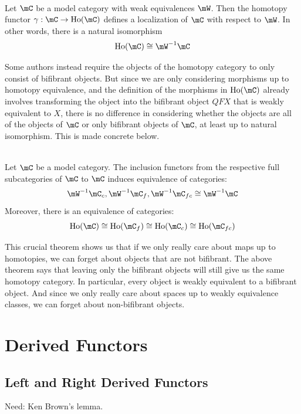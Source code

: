 \documentclass[a4paper]{article}
\begin{document}
\begin{prp}{}{}\\
Let $\mC$ be a model category with weak equivalences $\mW$. Then the homotopy functor $\gamma:\mC\to\text{Ho}(\mC)$ defines a localization of $\mC$ with respect to $\mW$. In other words, there is a natural isomorphism $$\text{Ho}(\mC)\cong\mW^{-1}\mC$$
\end{prp}

Some authors instead require the objects of the homotopy category to only consist of bifibrant objects. But since we are only considering morphisms up to homotopy equivalence, and the definition of the morphisms in $\text{Ho}(\mC)$ already involves transforming the object into the bifibrant object $QFX$ that is weakly equivalent to $X$, there is no difference in considering whether the objects are all of the objects of $\mC$ or only bifibrant objects of $\mC$, at least up to natural isomorphism. This is made concrete below. 

\begin{prp}{}{}\\
Let $\mC$ be a model category. The inclusion functors from the respective full subcategories of $\mC$ to $\mC$ induces equivalence of categories: $$\mW^{-1}\mC_c,\mW^{-1}\mC_f,\mW^{-1}\mC_{fc}\cong\mW^{-1}\mC$$ Moreover, there is an equivalence of categories: $$\text{Ho}(\mC)\cong\text{Ho}(\mC_f)\cong\text{Ho}(\mC_c)\cong\text{Ho}(\mC_{fc})$$
\end{prp}

This crucial theorem shows us that if we only really care about maps up to homotopies, we can forget about objects that are not bifibrant. The above theorem says that leaving only the bifibrant objects will still give us the same homotopy category. In particular, every object is weakly equivalent to a bifibrant object. And since we only really care about spaces up to weakly equivalence classes, we can forget about non-bifibrant objects. 


\pagebreak
\section{Derived Functors}
\subsection{Left and Right Derived Functors}
Need: Ken Brown's lemma. 
\end{document}
